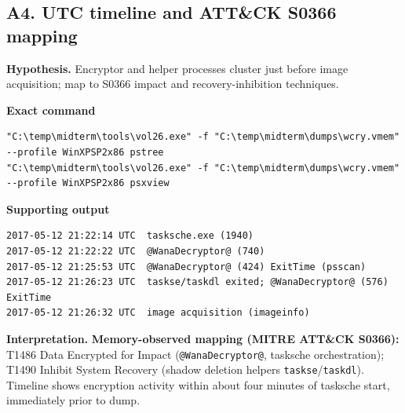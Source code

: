 \documentclass[11pt,letterpaper]{article}
\begin{document}
\subsection*{A4. UTC timeline and ATT\&CK S0366 mapping}
\textbf{Hypothesis.} Encryptor and helper processes cluster just before image acquisition; map to S0366 impact and recovery-inhibition techniques.
\par\medskip\noindent\textbf{Exact command}
\begin{lstlisting}
"C:\temp\midterm\tools\vol26.exe" -f "C:\temp\midterm\dumps\wcry.vmem" --profile WinXPSP2x86 pstree
"C:\temp\midterm\tools\vol26.exe" -f "C:\temp\midterm\dumps\wcry.vmem" --profile WinXPSP2x86 psxview
\end{lstlisting}
\noindent\textbf{Supporting output}
\begin{lstlisting}
2017-05-12 21:22:14 UTC  tasksche.exe (1940)
2017-05-12 21:22:22 UTC  @WanaDecryptor@ (740)
2017-05-12 21:25:53 UTC  @WanaDecryptor@ (424) ExitTime (psscan)
2017-05-12 21:26:23 UTC  taskse/taskdl exited; @WanaDecryptor@ (576) ExitTime
2017-05-12 21:26:32 UTC  image acquisition (imageinfo)
\end{lstlisting}
\noindent\textbf{Interpretation.} \textbf{Memory-observed mapping (MITRE ATT\&CK S0366):} T1486 Data Encrypted for Impact (\texttt{@WanaDecryptor@}, tasksche orchestration); T1490 Inhibit System Recovery (shadow deletion helpers \texttt{taskse}/\texttt{taskdl}). Timeline shows encryption activity within about four minutes of tasksche start, immediately prior to dump.
\vspace{0.55em}
\end{document}
